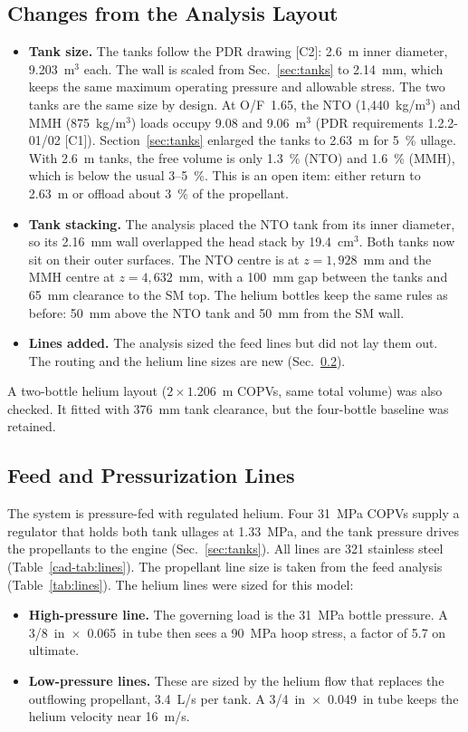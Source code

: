 \documentclass[10pt]{article}
\begin{document}
\subsection{Changes from the Analysis Layout}\label{cad-sec:changes}
\begin{itemize}
\item \textbf{Tank size.} The tanks follow the PDR drawing [C2]: 2.6~m inner diameter, 9.203~m$^3$ each. The wall is
scaled from Sec.~\ref{sec:tanks} to 2.14~mm, which keeps the same maximum operating pressure and allowable stress. The two tanks are the
same size by design. At O/F~1.65, the NTO (1,440~kg/m$^3$) and MMH (875~kg/m$^3$) loads occupy 9.08 and 9.06~m$^3$
(PDR requirements 1.2.2-01/02 [C1]). Section~\ref{sec:tanks} enlarged the tanks to 2.63~m for 5~\% ullage. With 2.6~m tanks,
the free volume is only 1.3~\% (NTO) and 1.6~\% (MMH), which is below the usual 3--5~\%. This is an open item: either
return to 2.63~m or offload about 3~\% of the propellant.
\item \textbf{Tank stacking.} The analysis placed the NTO tank from its inner diameter, so its 2.16~mm wall overlapped
the head stack by 19.4~cm$^3$. Both tanks now sit on their outer surfaces. The NTO centre is at $z = 1{,}928$~mm and
the MMH centre at $z = 4{,}632$~mm, with a 100~mm gap between the tanks and 65~mm clearance to the SM top. The helium
bottles keep the same rules as before: 50~mm above the NTO tank and 50~mm from the SM wall.
\item \textbf{Lines added.} The analysis sized the feed lines but did not lay them out. The routing and the helium line
sizes are new (Sec.~\ref{cad-sec:lines}).
\end{itemize}
A two-bottle helium layout ($2\times1.206$~m COPVs, same total volume) was also checked. It fitted with 376~mm tank
clearance, but the four-bottle baseline was retained.

\subsection{Feed and Pressurization Lines}\label{cad-sec:lines}
The system is pressure-fed with regulated helium. Four 31~MPa COPVs supply a regulator that holds both tank ullages at
1.33~MPa, and the tank pressure drives the propellants to the engine (Sec.~\ref{sec:tanks}). All lines are 321 stainless steel
(Table~\ref{cad-tab:lines}). The propellant line size is taken from the feed analysis (Table~\ref{tab:lines}). The helium lines were sized
for this model:
\begin{itemize}
\item \textbf{High-pressure line.} The governing load is the 31~MPa bottle pressure. A 3/8~in~$\times$~0.065~in tube
then sees a 90~MPa hoop stress, a factor of 5.7 on ultimate.
\item \textbf{Low-pressure lines.} These are sized by the helium flow that replaces the outflowing propellant, 3.4~L/s
per tank. A 3/4~in~$\times$~0.049~in tube keeps the helium velocity near 16~m/s.
\end{itemize}
\end{document}
